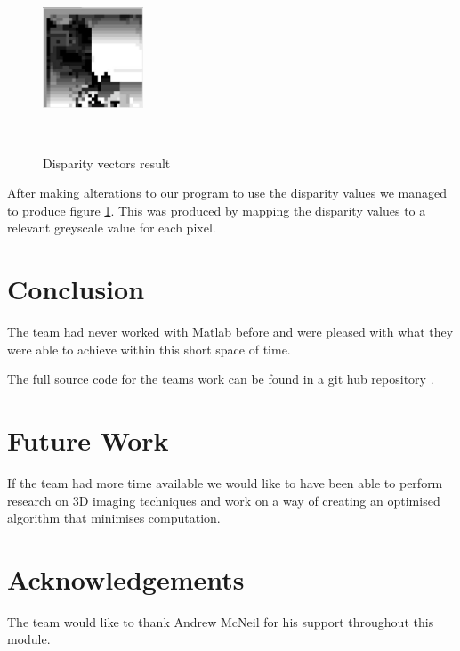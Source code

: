 \documentclass[twocolumn]{article}
\begin{document}
 \begin{figure}[H]
\centering
  \includegraphics[height=30mm]{Figures/Disp_Vectors_1}
    \caption{Disparity vectors result}~\label{fig:Disp_Vectors_1}
\end{figure} 

After making alterations to our program to use the disparity values we managed to produce figure \ref{fig:Disp_Vectors_1}. This was produced by mapping the disparity values to a relevant greyscale value for each pixel. 


\section{Conclusion}
\vspace{-1ex}

The team had never worked with Matlab before and were pleased with what they were able to achieve within this short space of time.
 

The full source code for the teams work can be found in a git hub repository \cite{githublink}.

\section{Future Work} 
\vspace{-1ex}

If the team had more time available we would like to have been able to perform research on 3D imaging techniques and work on a way of creating an optimised algorithm that minimises computation. 


\section*{Acknowledgements}
The team would like to thank Andrew McNeil for his support throughout this module.





\end{document}
